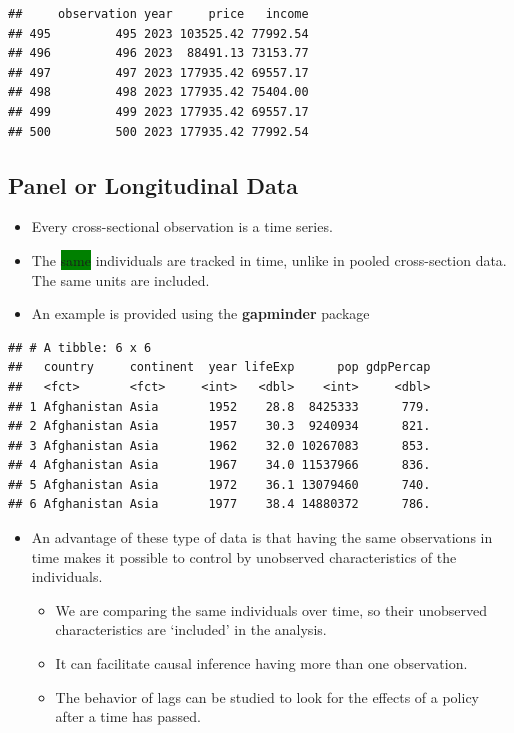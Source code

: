 \documentclass[
]{book}
\newcommand{\key}[1]{\colorbox{green}{#1}}
\theoremstyle{definition}
\theoremstyle{definition}
\theoremstyle{definition}
\theoremstyle{definition}
\theoremstyle{remark}
\begin{document}
\begin{verbatim}
##     observation year     price   income
## 495         495 2023 103525.42 77992.54
## 496         496 2023  88491.13 73153.77
## 497         497 2023 177935.42 69557.17
## 498         498 2023 177935.42 75404.00
## 499         499 2023 177935.42 69557.17
## 500         500 2023 177935.42 77992.54
\end{verbatim}

\subsection*{Panel or Longitudinal Data}\label{panel-or-longitudinal-data}

\begin{itemize}
\item
  Every cross-sectional observation is a time series.
\item
  The \key{same} individuals are tracked in time, unlike in pooled cross-section data. The same units are included.
\item
  An example is provided using the \textbf{gapminder} package \citep{gapminder}
\end{itemize}

\begin{verbatim}
## # A tibble: 6 x 6
##   country     continent  year lifeExp      pop gdpPercap
##   <fct>       <fct>     <int>   <dbl>    <int>     <dbl>
## 1 Afghanistan Asia       1952    28.8  8425333      779.
## 2 Afghanistan Asia       1957    30.3  9240934      821.
## 3 Afghanistan Asia       1962    32.0 10267083      853.
## 4 Afghanistan Asia       1967    34.0 11537966      836.
## 5 Afghanistan Asia       1972    36.1 13079460      740.
## 6 Afghanistan Asia       1977    38.4 14880372      786.
\end{verbatim}

\begin{itemize}
\item
  An advantage of these type of data is that having the same observations in time makes it possible to control by unobserved characteristics of the individuals.

  \begin{itemize}
  \item
    We are comparing the same individuals over time, so their unobserved characteristics are `included' in the analysis.
  \item
    It can facilitate causal inference having more than one observation.
  \item
    The behavior of lags can be studied to look for the effects of a policy after a time has passed.
  \end{itemize}
\end{itemize}
\end{document}
